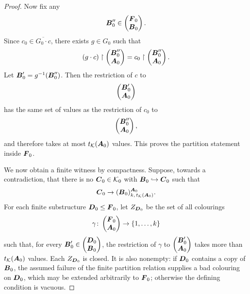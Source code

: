 \begin{proof}
    Now fix any
    \[
        \boldsymbol{B}_0''\in\begin{pmatrix}\boldsymbol{F}_0\\ \boldsymbol{B}_0\end{pmatrix}.
    \]
    Since \(c_0\in \overline{G_0\cdot c}\), there exists \(g\in G_0\) such that
    \[
        (g\cdot c)\restriction\begin{pmatrix}\boldsymbol{B}_0''\\ \boldsymbol{A}_0\end{pmatrix}
        =
        c_0\restriction\begin{pmatrix}\boldsymbol{B}_0''\\ \boldsymbol{A}_0\end{pmatrix}.
    \]
    Let \(\boldsymbol{B}_0'=g^{-1}(\boldsymbol{B}_0'')\).
    Then the restriction of \(c\) to
    \[
        \begin{pmatrix}\boldsymbol{B}_0'\\ \boldsymbol{A}_0\end{pmatrix}
    \]
    has the same set of values as the restriction of \(c_0\) to
    \[
        \begin{pmatrix}\boldsymbol{B}_0''\\ \boldsymbol{A}_0\end{pmatrix},
    \]
    and therefore takes at most \(t_{\mathcal{K}}(\boldsymbol{A}_0)\) values. This proves the
    partition statement inside \(\boldsymbol{F}_0\).

    We now obtain a finite witness by compactness. Suppose, towards a
    contradiction, that there is no \(\boldsymbol{C}_0\in\mathcal{K}_0\) with
    \(\boldsymbol{B}_0\hookrightarrow\boldsymbol{C}_0\) such that
    \[
        \boldsymbol{C}_0\to
        (\boldsymbol{B}_0)^{\boldsymbol{A}_0}_{k,\,t_{\mathcal{K}}(\boldsymbol{A}_0)}.
    \]
    For each finite substructure \(\boldsymbol{D}_0\leq\boldsymbol{F}_0\), let \(Z_{\boldsymbol{D}_0}\) be
    the set of all colourings
    \[
        \gamma\colon
        \begin{pmatrix}\boldsymbol{F}_0\\ \boldsymbol{A}_0\end{pmatrix}
        \to\{1,\dots,k\}
    \]
    such that, for every
    \(\boldsymbol{B}_0'\in\begin{pmatrix}\boldsymbol{D}_0\\ \boldsymbol{B}_0\end{pmatrix}\), the restriction
    of \(\gamma\) to
    \(\begin{pmatrix}\boldsymbol{B}_0'\\ \boldsymbol{A}_0\end{pmatrix}\) takes more than
    \(t_{\mathcal{K}}(\boldsymbol{A}_0)\) values. Each \(Z_{\boldsymbol{D}_0}\) is closed. It is also
    nonempty: if \(\boldsymbol{D}_0\) contains a copy of \(\boldsymbol{B}_0\), the assumed failure
    of the finite partition relation supplies a bad colouring on \(\boldsymbol{D}_0\),
    which may be extended arbitrarily to \(\boldsymbol{F}_0\); otherwise the defining
    condition is vacuous.


\end{proof}
